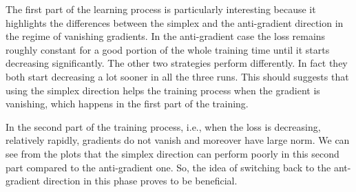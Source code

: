 The first part of the learning process is particularly interesting because it highlights the differences between the simplex and the anti-gradient direction in the regime of vanishing gradients. In the anti-gradient case the loss remains roughly constant for a good portion of the whole training time until it starts decreasing significantly. The other two strategies perform differently. In fact they both start decreasing a lot sooner in all the three runs. This should suggests that using the simplex direction helps the training process when the gradient is vanishing, which happens in the first part of the training. 

In the second part of the training process, i.e., when the loss is decreasing, relatively rapidly, gradients do not vanish and moreover have large norm. We can see from the plots that the simplex direction can perform poorly in this second part compared to the anti-gradient one. So, the idea of switching back to the ant-gradient direction in this phase proves to be beneficial.



